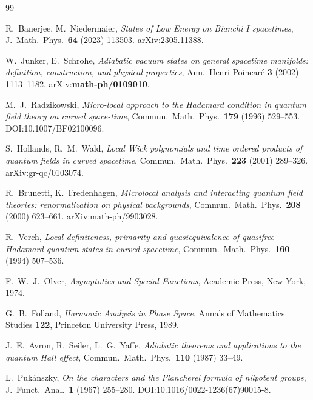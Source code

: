 \documentclass[11pt, a4paper]{article}
\begin{document}
\begin{thebibliography}{99}

R.~Banerjee, M.~Niedermaier,
\textit{States of Low Energy on Bianchi I spacetimes},
J.\ Math.\ Phys.\ \textbf{64} (2023) 113503.
arXiv:2305.11388.

W.~Junker, E.~Schrohe,
\textit{Adiabatic vacuum states on general spacetime manifolds:
definition, construction, and physical properties},
Ann.\ Henri Poincaré \textbf{3} (2002) 1113--1182.
arXiv:\textbf{math-ph/0109010}.

M.~J.~Radzikowski,
\textit{Micro-local approach to the Hadamard condition in quantum field theory
on curved space-time},
Commun.\ Math.\ Phys.\ \textbf{179} (1996) 529--553.
DOI:10.1007/BF02100096.

S.~Hollands, R.~M.~Wald,
\textit{Local Wick polynomials and time ordered products of quantum fields
in curved spacetime},
Commun.\ Math.\ Phys.\ \textbf{223} (2001) 289--326.
arXiv:gr-qc/0103074.

R.~Brunetti, K.~Fredenhagen,
\textit{Microlocal analysis and interacting quantum field theories:
renormalization on physical backgrounds},
Commun.\ Math.\ Phys.\ \textbf{208} (2000) 623--661.
arXiv:math-ph/9903028.

R.~Verch,
\textit{Local definiteness, primarity and quasiequivalence of quasifree
Hadamard quantum states in curved spacetime},
Commun.\ Math.\ Phys.\ \textbf{160} (1994) 507--536.

F.~W.~J.~Olver,
\textit{Asymptotics and Special Functions},
Academic Press, New York, 1974.

G.~B.~Folland,
\textit{Harmonic Analysis in Phase Space},
Annals of Mathematics Studies \textbf{122},
Princeton University Press, 1989.

J.~E.~Avron, R.~Seiler, L.~G.~Yaffe,
\textit{Adiabatic theorems and applications to the quantum Hall effect},
Commun.\ Math.\ Phys.\ \textbf{110} (1987) 33--49.

L.~Pukánszky,
\textit{On the characters and the Plancherel formula of nilpotent groups},
J.\ Funct.\ Anal.\ \textbf{1} (1967) 255--280.
DOI:10.1016/0022-1236(67)90015-8.

\end{thebibliography}
\end{document}
